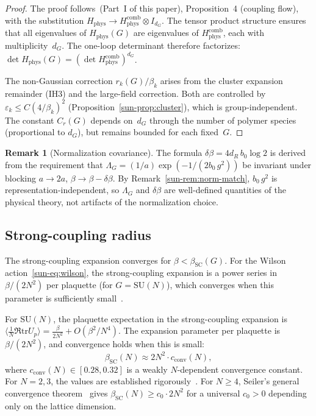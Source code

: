 \documentclass[11pt]{article}
\theoremstyle{definition}
\newtheorem{remark}[theorem]{Remark}
\newcommand{\SU}{\mathrm{SU}}
\newcommand{\tr}{\mathrm{tr}}
\begin{document}
\begin{proof}
The proof follows~(Part~I of this paper), Proposition~4
(coupling flow), with the substitution
$H_{\mathrm{phys}}\to
H_{\mathrm{phys}}^{\mathrm{comb}}\otimes I_{d_G}$.
The tensor product structure ensures that all
eigenvalues of $H_{\mathrm{phys}}(G)$ are eigenvalues
of $H_{\mathrm{phys}}^{\mathrm{comb}}$, each with
multiplicity~$d_G$.  The one-loop determinant therefore
factorizes:
$\det H_{\mathrm{phys}}(G)
=(\det H_{\mathrm{phys}}^{\mathrm{comb}})^{d_G}$.

The non-Gaussian correction $r_k(G)/\beta_k$ arises
from the cluster expansion remainder (IH3) and the
large-field correction.  Both are controlled by
$\varepsilon_k\le C(4/\beta_k)^2$
(Proposition~\ref{sun-prop:cluster}), which is
group-independent.  The constant $C_r(G)$ depends
on~$d_G$ through the number of polymer species
(proportional to $d_G$), but remains bounded for each
fixed~$G$.
\end{proof}

\begin{remark}[Normalization covariance]
\label{sun-rem:covariance}
The formula $\delta\beta=4d_R\,b_0\log 2$ is derived from
the requirement that
$\Lambda_G=(1/a)\exp(-1/(2b_0\,g^2))$
be invariant under blocking $a\to 2a$,
$\beta\to\beta-\delta\beta$.
By Remark~\ref{sun-rem:norm-match},
$b_0\,g^2$ is
representation-independent, so $\Lambda_G$ and
$\delta\beta$ are well-defined quantities of the
physical theory, not artifacts of the normalization
choice.
\end{remark}

\subsection{Strong-coupling radius}\label{sun-subsec:strong}

The strong-coupling expansion converges for
$\beta<\beta_{\mathrm{SC}}(G)$.  For the Wilson
action~\eqref{sun-eq:wilson}, the strong-coupling
expansion is a power series in $\beta/(2N^2)$
per plaquette (for $G=\SU(N)$), which converges
when this parameter is sufficiently
small~\cite{Seiler82,Munster81}.

For $\SU(N)$, the plaquette expectation in the
strong-coupling expansion is
$\langle\frac{1}{N}\Re\tr U_p\rangle
=\frac{\beta}{2N^2}+O(\beta^2/N^4)$.
The expansion parameter per plaquette is
$\beta/(2N^2)$, and convergence holds when this
is small:
\begin{equation}
\beta_{\mathrm{SC}}(N)
\approx 2N^2\cdot c_{\mathrm{conv}}(N),
\end{equation}
where $c_{\mathrm{conv}}(N)\in[0.28,0.32]$ is a weakly
$N$-dependent convergence constant.  For $N=2,3$,
the values are established
rigorously~\cite{Seiler82,Munster81}.  For $N\ge 4$,
Seiler's general convergence
theorem~\cite{Seiler82} gives $\beta_{\mathrm{SC}}(N)
\ge c_0\cdot 2N^2$ for a universal $c_0>0$ depending
only on the lattice dimension.
\end{document}
